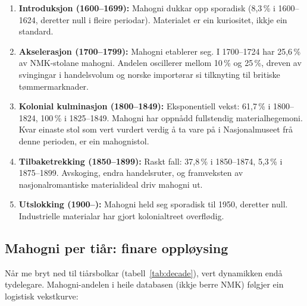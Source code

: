 \documentclass[10pt, a4paper, twocolumn]{article}
\begin{document}
\begin{enumerate}
  \item \textbf{Introduksjon (1600--1699):} Mahogni dukkar opp sporadisk (8,3\,\% i 1600--1624, deretter null i fleire periodar). Materialet er ein kuriositet, ikkje ein standard.
  \item \textbf{Akselerasjon (1700--1799):} Mahogni etablerer seg. I 1700--1724 har 25,6\,\% av NMK-stolane mahogni. Andelen oscillerer mellom 10\,\% og 25\,\%, dreven av svingingar i handelsvolum og norske importørar si tilknyting til britiske tømmermarknader.
  \item \textbf{Kolonial kulminasjon (1800--1849):} Eksponentiell vekst: 61,7\,\% i 1800--1824, 100\,\% i 1825--1849. Mahogni har oppnådd fullstendig materialhegemoni. Kvar einaste stol som vert vurdert verdig å ta vare på i Nasjonalmuseet frå denne perioden, er ein mahognistol.
  \item \textbf{Tilbaketrekking (1850--1899):} Raskt fall: 37,8\,\% i 1850--1874, 5,3\,\% i 1875--1899. Avskoging, endra handelsruter, og framveksten av nasjonalromantiske materialideal driv mahogni ut.
  \item \textbf{Utslokking (1900--):} Mahogni held seg sporadisk til 1950, deretter null. Industrielle materialar har gjort kolonialtreet overflødig.
\end{enumerate}

\subsection{Mahogni per tiår: finare oppløysing}

Når me bryt ned til tiårsbolkar (tabell~\ref{tab:decade}), vert dynamikken endå tydelegare. Mahogni-andelen i heile databasen (ikkje berre NMK) følgjer ein logistisk vekstkurve:
\end{document}
